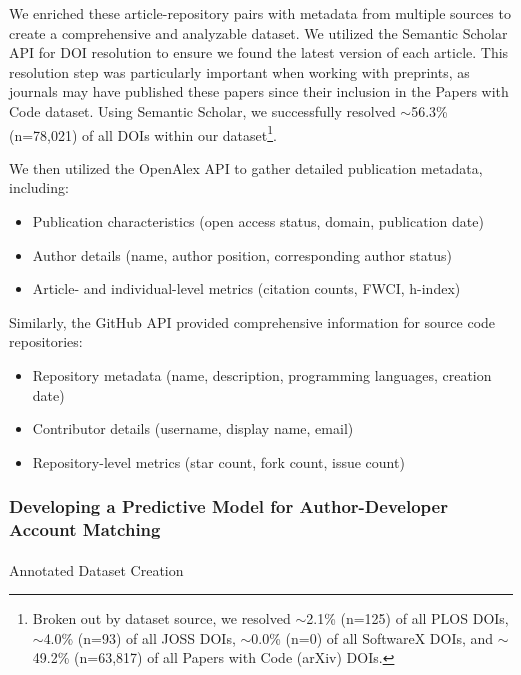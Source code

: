 \documentclass[
  letterpaper,
  DIV=11,
  numbers=noendperiod]{scrartcl}
\makeatletter
\let\oldparagraph\paragraph
\renewcommand{\paragraph}{
    \@ifstar
      \xxxParagraphStar
      \xxxParagraphNoStar
  }
\newcommand{\xxxParagraphStar}[1]{\oldparagraph*{#1}\mbox{}}
\newcommand{\xxxParagraphNoStar}[1]{\oldparagraph{#1}\mbox{}}
\providecommand{\tightlist}{%
  \setlength{\itemsep}{0pt}\setlength{\parskip}{0pt}}
\makeatother
\begin{document}
We enriched these article-repository pairs with metadata from multiple
sources to create a comprehensive and analyzable dataset. We utilized
the Semantic Scholar API for DOI resolution to ensure we found the
latest version of each article. This resolution step was particularly
important when working with preprints, as journals may have published
these papers since their inclusion in the Papers with Code dataset.
Using Semantic Scholar, we successfully resolved $\sim$56.3\%
(n=78,021) of all DOIs within our dataset\footnote{Broken out by dataset
  source, we resolved $\sim$2.1\% (n=125) of all PLOS DOIs,
  $\sim$4.0\% (n=93) of all JOSS DOIs, $\sim$0.0\%
  (n=0) of all SoftwareX DOIs, and $\sim$49.2\% (n=63,817) of
  all Papers with Code (arXiv) DOIs.}.

We then utilized the OpenAlex API to gather detailed publication
metadata, including:

\begin{itemize}
\tightlist
\item
  Publication characteristics (open access status, domain, publication
  date)
\item
  Author details (name, author position, corresponding author status)
\item
  Article- and individual-level metrics (citation counts, FWCI, h-index)
\end{itemize}

Similarly, the GitHub API provided comprehensive information for source
code repositories:

\begin{itemize}
\tightlist
\item
  Repository metadata (name, description, programming languages,
  creation date)
\item
  Contributor details (username, display name, email)
\item
  Repository-level metrics (star count, fork count, issue count)
\end{itemize}

\subsubsection{Developing a Predictive Model for Author-Developer
Account
Matching}\label{developing-a-predictive-model-for-author-developer-account-matching}

\paragraph{Annotated Dataset Creation}\label{annotated-dataset-creation}
\end{document}
